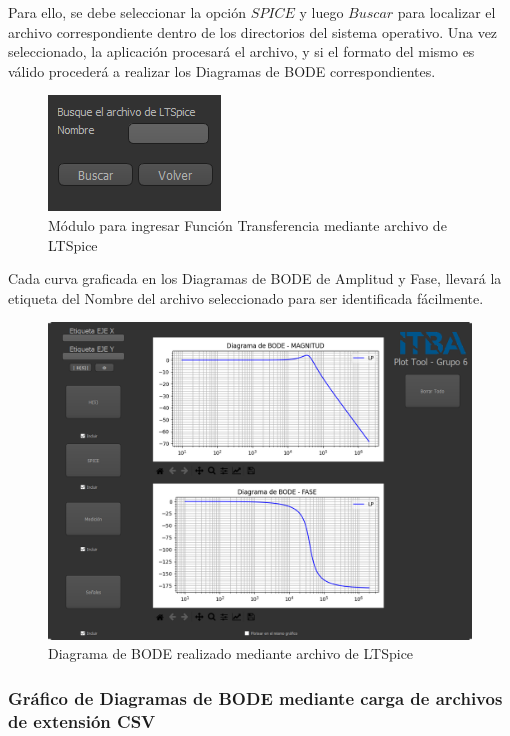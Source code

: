 Para ello, se debe seleccionar la opción $SPICE$ y luego $Buscar$ para localizar el archivo correspondiente dentro de los directorios del sistema operativo. 
Una vez seleccionado, la aplicación procesará el archivo, y si el formato del mismo es válido procederá a realizar los Diagramas de BODE correspondientes.

\begin{figure}[!htb] 
    \centering 
    \includegraphics [scale=0.8]{../EJ2/LatexScreenshots/plotToolSpiceFunctionInput.png} 
    \caption{Módulo para ingresar Función Transferencia mediante archivo de LTSpice}
    \label{fig:spiceFunctionInputPlotTool}
\end{figure}

Cada curva graficada en los Diagramas de BODE de Amplitud y Fase, llevará la etiqueta del Nombre del archivo seleccionado para ser identificada fácilmente.

\begin{figure}[!htb] 
    \centering 
    \includegraphics [width=0.8
    \textwidth] {../EJ2/LatexScreenshots/plotToolSpice.png} 
    \caption{Diagrama de BODE realizado mediante archivo de LTSpice}
    \label{fig:spiceFunctionPlotTool}
\end{figure}

\subsubsection{Gráfico de Diagramas de BODE mediante carga de archivos de extensión CSV}


